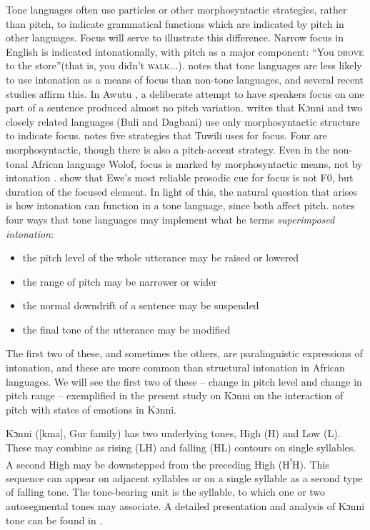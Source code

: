 \documentclass[output=paper]{langsci/langscibook}
\begin{document}
Tone languages often use particles or other morphosyntactic strategies, rather than pitch, to indicate grammatical functions which are indicated by pitch in other languages. Focus will serve to illustrate this difference. Narrow focus in English is indicated intonationally, with pitch as a major component:  ``You \textsc{drove} to the store''(that is, you didn't  \textsc{walk}...). \citet[73]{cruttenden1997} notes that tone languages are less likely to use intonation as a means of focus than non-tone languages, and several recent studies affirm this. In Awutu \citep{Lomotey2014}, a deliberate attempt to have speakers focus on one part of a sentence produced almost no pitch variation. \citet{Schwarz2009copula} writes that Kɔnni and two closely related languages (Buli and Dagbani) use only morphosyntactic structure to indicate focus. \citet{harley2009} notes five strategies that Tuwili uses for focus. Four are morphosyntactic, though there is also a pitch-accent strategy. Even in the non-tonal African language Wolof, focus is marked by morphosyntactic means, not by intonation \citep{riallandrobert2001}. \citet{fiedlerjannedy2013} show that Ewe's most reliable prosodic cue for focus is not F0, but duration of the focused element.
% 
In light of this, the natural question that arises is how intonation can function in a tone language, since both affect pitch. \citet[9--10]{cruttenden1997} notes four ways that tone languages may implement what he terms \emph{superimposed intonation}:

\begin{itemize}[noitemsep]
\item the pitch level of the whole utterance may be raised or lowered
\item the range of pitch may be narrower or wider
\item the normal downdrift of a sentence may be suspended
\item the final tone of the utterance may be modified
\end{itemize}

The first two of these, and sometimes the others, are paralinguistic expressions of intonation, and these are more common than structural intonation in African languages. We will see the first two of these -- change in pitch level and change in pitch range -- exemplified in the present study on Kɔnni on the interaction of pitch with states of emotions in Kɔnni.

Kɔnni ([kma], Gur family) has two underlying tones, High (H) and Low (L). These may combine as rising (LH) and falling (HL) contours on single syllables. A second High may be downstepped from the preceding High (H\textsuperscript{!}H). This sequence can appear on adjacent syllables or on a single syllable as a second type of falling tone. The tone-bearing unit is the syllable, to which one or two autosegmental tones may associate. A detailed presentation and analysis of Kɔnni tone can be found in \citet{Cahill2007aspects}. 
\end{document}
